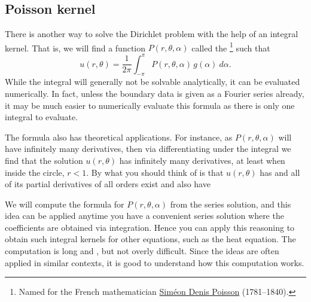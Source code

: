 \documentclass[12pt]{book}
\begin{document}

\subsection{Poisson kernel}

There is another way to solve the Dirichlet problem with the help of an
integral kernel.  That is, we will find a function $P(r,\theta,\alpha)$
called the \emph{}\footnote{%
Named for the French mathematician
\href{http://en.wikipedia.org/wiki/Sim\%C3\%A9on_Denis_Poisson}{Sim\'eon
Denis Poisson}
(1781--1840).} such that
\begin{equation*}
u(r,\theta) = 
\frac{1}{2\pi}
\int_{-\pi}^{\pi}
P(r,\theta,\alpha) \, g(\alpha) ~d\alpha .
\end{equation*}
While the integral will generally not be solvable analytically, it can
be evaluated numerically.   In fact, unless the boundary data is given
as a Fourier series already, it may be much easier to numerically
evaluate this formula as there is only one integral to evaluate.

The formula also has theoretical applications.
For instance, as $P(r,\theta,\alpha)$ 
will have infinitely many derivatives, then
via differentiating under the integral we find
that the solution $u(r,\theta)$ has infinitely many derivatives, at least
when inside the circle, $r < 1$.  By  what you
should think of is that $u(r,\theta)$ has  and all of its
partial derivatives of all orders exist and also have 


We will compute
the formula for $P(r,\theta,\alpha)$ from the series
solution, and this idea can be applied anytime you have a convenient
series solution where the coefficients are obtained via integration.
Hence you can apply this reasoning to obtain such integral kernels
for other equations, such as the heat equation.
The computation is long and , but not overly difficult.
Since the ideas are often applied in similar contexts, it is good to
understand how this computation works.
\end{document}
